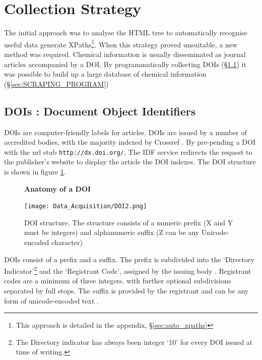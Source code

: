 \section{Collection Strategy}
The initial approach was to analyse the HTML tree to automatically recognise useful data generate XPaths\footnote{This approach is detailed in the appendix, \S\ref{sec:auto_xpaths}}. When this strategy proved unsuitable, a new method was required. Chemical information is usually disseminated as journal articles accompanied by a DOI. By programmatically collecting DOIs (\S\ref{sec:DOI}) it was possible to build up a large database of chemical information (\S\ref{sec:SCRAPING_PROGRAM})
\subsection{DOIs : Document Object Identifiers}
\label{sec:DOI}
DOIs are computer-friendly labels for articles. DOIs are issued by a number of accredited bodies, with the majority indexed by Crossref \cite{crossref-formation}. By pre-pending a DOI with the url stub \texttt{http://dx.doi.org/}, The IDF service redirects the request to the publisher's website to display the article the DOI indexes. The DOI structure is shown in figure \ref{fig:DOI}.
\begin{figure}[H]
    \centering
    \textbf{Anatomy of a DOI}\par\medskip
    \texttt{[image: Data\_Acquisition/DOI2.png]}
    \caption[Anatomy of a DOI]{DOI structure. The structure consists of a numeric prefix (X and Y must be integers) and alphanumeric suffix (Z can be any Unicode-encoded character)} \label{fig:DOI}
\end{figure}
DOIs consist of a prefix and a suffix. The prefix is subdivided into the ‘Directory Indicator’\footnote{The Directory indicator has always been integer ‘10’ for every DOI issued at time of writing.} and the ‘Registrant Code’, assigned by the issuing body \cite{doi_handbook1}. Registrant codes are a minimum of three integers, with further optional subdivisions separated by full stops. The suffix is provided by the registrant and can be any form of unicode-encoded text \cite{doi_handbook1}.

